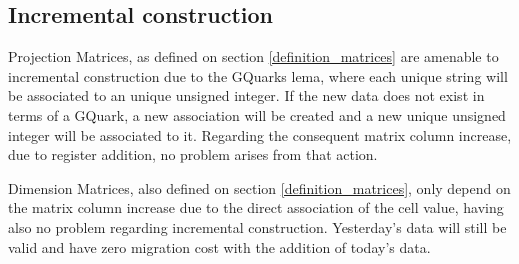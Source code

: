 \subsection{Incremental construction}
Projection Matrices, as defined on section \ref{definition_matrices} are amenable to incremental construction due to the GQuarks lema, where each unique string will be associated to an unique unsigned integer. If the new data does not exist in terms of a GQuark, a new association will be created and a new unique unsigned integer will be associated to it. Regarding the consequent matrix column increase, due to register addition, no problem arises from that action.\par 
Dimension Matrices, also defined on section \ref{definition_matrices}, only depend on the matrix column increase due to the direct association of the cell value, having also no problem regarding incremental construction.
Yesterday's data will still be valid and have zero migration cost with the addition of today's data.



    
 

